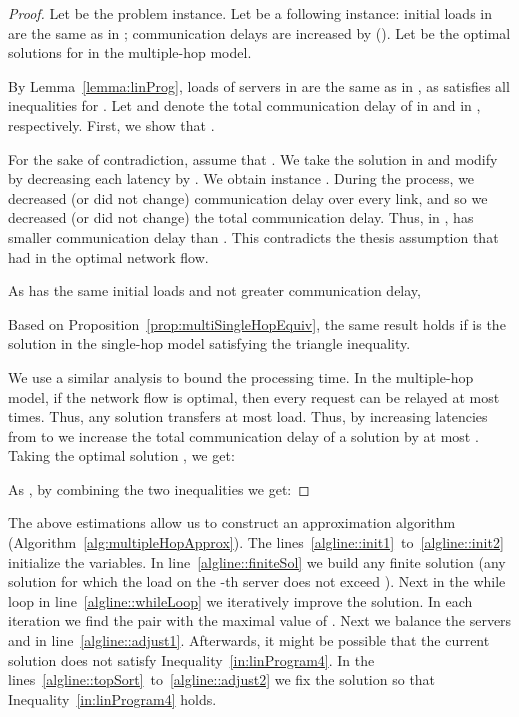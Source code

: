\documentclass[11pt]{article}
\begin{document}
\begin{proof}
Let  be the problem instance. Let  be a following instance: initial loads  in  are the same as in ; communication delays  are increased by  (). Let  be the optimal solutions for  in the multiple-hop model.

By Lemma~\ref{lemma:linProg}, loads of servers in  are the same as in , as  satisfies all inequalities for . 
Let  and  denote the total communication delay of  in  and  in , respectively.
First, we show that .

For the sake of contradiction, assume that . We take the solution  in  and modify  by decreasing each latency  by . We obtain instance .
During the process, we decreased (or did not change) communication delay over every link, and so we decreased (or did not change) the total communication delay. Thus, in ,  has smaller communication delay than . This contradicts the thesis assumption that  had in  the optimal network flow. 

As  has the same initial loads and not greater communication delay,

Based on Proposition~\ref{prop:multiSingleHopEquiv}, the same result holds if  is the solution in the single-hop model satisfying the triangle inequality.



We use a similar analysis to bound the processing time.
In the multiple-hop model, if the network flow is optimal, then every request can be relayed at most  times. 
Thus, any solution transfers at most  load. 
Thus, by increasing latencies from  to  we increase the total communication delay of a solution by at most . Taking the optimal solution , we get:


As , by combining the two inequalities we get:

\end{proof}

The above estimations allow us to construct an approximation algorithm (Algorithm~\ref{alg:multipleHopApprox}). The lines~\ref{algline::init1}~to~\ref{algline::init2} initialize the variables. In line~\ref{algline::finiteSol} we build any finite solution (any solution for which the load  on the -th server does not exceed ). Next in the while loop in line~\ref{algline::whileLoop} we iteratively improve the solution. In each iteration we find the pair  with the maximal value of . Next we balance the servers  and  in line~\ref{algline::adjust1}. Afterwards, it might be possible that the current solution does not satisfy Inequality~\ref{in:linProgram4}. In the lines~\ref{algline::topSort}~to~\ref{algline::adjust2} we fix the solution so that Inequality~\ref{in:linProgram4} holds.
\end{document}
